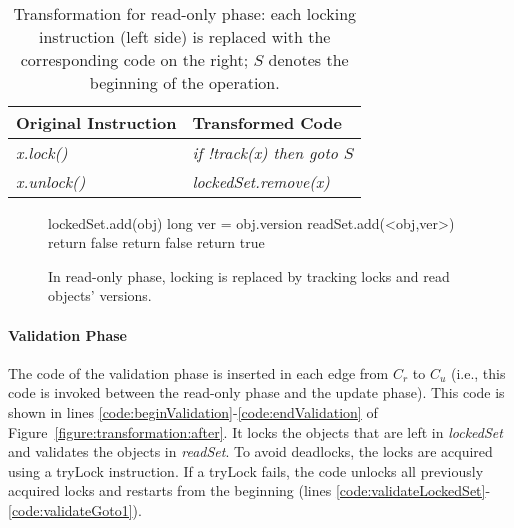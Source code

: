 \begin{table}
\codesize
\ttfamily
{\tt
\begin{center}
\begin{tabular}{|l|l|}
\hline
\textbf{Original Instruction} & \textbf{Transformed Code}\\
\hline
\textit{x.lock()}&
\textit{if !track(x) then goto $S$}
\\
\hline
\textit{x.unlock()}&
\textit{lockedSet.remove(x)}
\\
\hline
\end{tabular}
\end{center}
}
\caption{Transformation for read-only phase:
each locking instruction (left side) is replaced with the corresponding code on the right;
 $S$  denotes the beginning of the operation.
}
\label{Ta:readOnlyTransformation}
\end{table}

\begin{figure}
\codesize
\begin{algorithmic}[1]{}
		{\ttfamily
		\State{}lockedSet.add(obj) \label{code:lockedSet:add}
			\State long ver = obj.version \label{code:track:getVersion}
			\State readSet.add(<obj,ver>)
			 \label{code:track:verifyVersion}
				\State return false
			\EndIf
				\State return false \label{code:track:verifyUnlocked}
			\EndIf
			\State return true
		\EndFunction
		}
\end{algorithmic}
\caption{In read-only phase, locking is replaced by
tracking locks and read
objects' versions.
\label{figure::track}}
\end{figure}

\paragraph{Validation Phase}
The code of the validation phase is inserted in each edge from $C_r$ to $C_u$ (i.e., this code is invoked between the read-only phase and the update phase).
This code is shown in lines \ref{code:beginValidation}-\ref{code:endValidation} of Figure~\ref{figure:transformation:after}.
It locks the objects that are left in \emph{lockedSet} and validates the objects in \emph{readSet}.
To avoid deadlocks, the locks are acquired using a tryLock
instruction.
If a tryLock fails, the code unlocks  all
previously acquired locks and restarts from the beginning
(lines \ref{code:validateLockedSet}-\ref{code:validateGoto1}).


